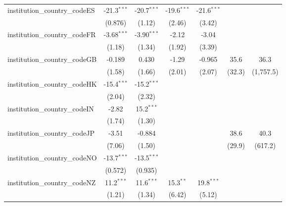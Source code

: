 \begin{tabular}{lcccccc}
   institution\_country\_codeES          & -21.3$^{***}$ & -20.7$^{***}$ & -19.6$^{***}$ & -21.6$^{***}$ &              &   \\   
                                         & (0.876)       & (1.12)        & (2.46)        & (3.42)        &              &   \\   
   institution\_country\_codeFR          & -3.68$^{***}$ & -3.90$^{***}$ & -2.12         & -3.04         &              &   \\   
                                         & (1.18)        & (1.34)        & (1.92)        & (3.39)        &              &   \\   
   institution\_country\_codeGB          & -0.189        & 0.430         & -1.29         & -0.965        & 35.6         & 36.3\\   
                                         & (1.58)        & (1.66)        & (2.01)        & (2.07)        & (32.3)       & (1,757.5)\\   
   institution\_country\_codeHK          & -15.4$^{***}$ & -15.2$^{***}$ &               &               &              &   \\   
                                         & (2.04)        & (2.32)        &               &               &              &   \\   
   institution\_country\_codeIN          & -2.82         & 15.2$^{***}$  &               &               &              &   \\   
                                         & (1.74)        & (1.30)        &               &               &              &   \\   
   institution\_country\_codeJP          & -3.51         & -0.884        &               &               & 38.6         & 40.3\\   
                                         & (7.06)        & (1.50)        &               &               & (29.9)       & (617.2)\\   
   institution\_country\_codeNO          & -13.7$^{***}$ & -13.5$^{***}$ &               &               &              &   \\   
                                         & (0.572)       & (0.935)       &               &               &              &   \\   
   institution\_country\_codeNZ          & 11.2$^{***}$  & 11.6$^{***}$  & 15.3$^{**}$   & 19.8$^{***}$  &              &   \\   
                                         & (1.21)        & (1.34)        & (6.42)        & (5.12)        &              &   \\   

\end{tabular}
